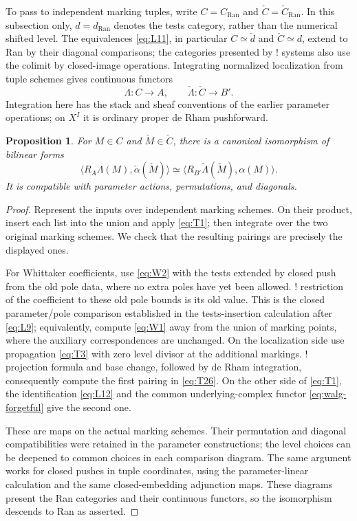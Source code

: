 \documentclass[11pt]{article}
\numberwithin{equation}{section}
\newtheorem{proposition}[theorem]{Proposition}
\theoremstyle{definition}
\theoremstyle{remark}
\begin{document}
To pass to independent marking tuples, write $C=C_{\mathrm{Ran}}$ and
$\check C=\check C_{\mathrm{Ran}}$.  In this subsection only, $d=d_{\mathrm{Ran}}$
denotes the tests category, rather than the numerical shifted level.
The equivalences \eqref{eq:L11}, in particular
$C\simeq\check d$ and $\check C\simeq d$, extend to Ran by their diagonal
comparisons; the categories presented by ! systems also use the colimit
by closed-image operations.  Integrating normalized localization from
tuple schemes gives continuous functors
\[
                \Lambda:C\longrightarrow A,
       \qquad \check\Lambda:\check C\longrightarrow B'.
\]
Integration here has the stack and sheaf conventions of the earlier
parameter operations; on $X^I$ it is ordinary proper de Rham pushforward.

\begin{proposition}\label{prop:ran-pairing}
For $M\in C$ and $\check M\in\check C$, there is a canonical isomorphism
of bilinear forms
\begin{equation}\label{eq:T26}
 \bigl\langle R_A\Lambda(M),\check\alpha(\check M)\bigr\rangle
 \simeq
 \bigl\langle R_{B'}\check\Lambda(\check M),\alpha(M)\bigr\rangle.
\end{equation}
It is compatible with parameter actions, permutations, and diagonals.
\end{proposition}

\begin{proof}
Represent the inputs over independent marking schemes.  On their product,
insert each list into the union and apply \eqref{eq:T1}; then integrate
over the two original marking schemes.  We check that the resulting
pairings are precisely the displayed ones.

For Whittaker coefficients, use \eqref{eq:W2} with the tests extended by
closed push from the old pole data, where no extra poles have yet been
allowed.  ! restriction of the coefficient to these old pole bounds is
its old value.  This is the closed parameter/pole comparison established
in the tests-insertion calculation after \eqref{eq:L9}; equivalently,
compute \eqref{eq:W1} away from the union of marking points, where the
auxiliary correspondences are unchanged.  On the localization side use
propagation \eqref{eq:T3} with zero level divisor at the additional
markings.  ! projection formula and base change, followed by de Rham
integration, consequently compute the first pairing in \eqref{eq:T26}.
On the other side of \eqref{eq:T1}, the identification \eqref{eq:L12}
and the common underlying-complex functor \eqref{eq:walg-forgetful}
give the second one.

These are maps on the actual marking schemes.  Their permutation and
diagonal compatibilities were retained in the parameter constructions;
the level choices can be deepened to common choices in each comparison
diagram.  The same argument works for closed pushes in tuple coordinates,
using the parameter-linear calculation and the same closed-embedding
adjunction maps.  These diagrams present the Ran categories and their
continuous functors, so the isomorphism descends to Ran as asserted.
\end{proof}
\end{document}
